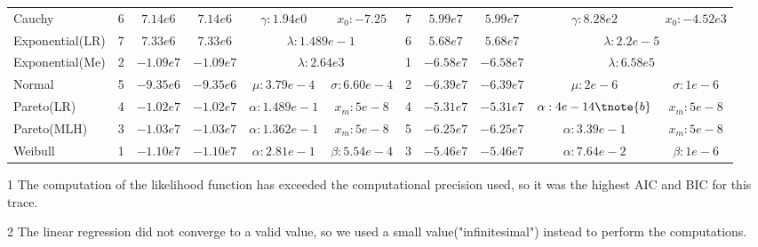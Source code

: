 \begin{table}
\begin{threeparttable}[t]
\begin{tabular}{lcccccccccc}
            Cauchy          &    6 & $7.14e6$    & $7.14e6$   & $\gamma:1.94e0$ &$x_0:-7.25$    
            &    7 & $5.99e7$    & $5.99e7$   & $ \gamma:8.28e2$ &$x_0:-4.52e3$    \\
            Exponential(LR) &    7 & $7.33e6$    & $7.33e6$   & \multicolumn{2}{c}{$\lambda:1.489e-1$}   
            &    6 & $5.68e7$    & $ 5.68e7$  & \multicolumn{2}{c}{$\lambda:2.2e-5$}   \\
            Exponential(Me) &    2 & $-1.09e7$   & $-1.09e7$  & \multicolumn{2}{c}{$\lambda:2.64e3$}   
            &    1 & $-6.58e7$   & $-6.58e7$  & \multicolumn{2}{c}{$\lambda:6.58e5$} \\
            Normal          &    5 & $-9.35e6$   & $-9.35e6$  & $\mu:3.79e-4$   &$\sigma:6.60e-4$ 
            &    2 & $-6.39e7$   & $-6.39e7$  & $\mu:2e-6$     & $\sigma:1e-6$ \\
            Pareto(LR)      &    4 & $-1.02e7$   & $-1.02e7$  & $\alpha:1.489e-1 $ & $x_m:5e-8 $    
            &    4 & $-5.31e7$   & $-5.31e7$  & $\alpha:4e-14\tnote{b}$ & $x_m:5e-8 $    \\
            Pareto(MLH)     &    3 & $-1.03e7$   & $-1.03e7$  & $\alpha:1.362e-1$ & $x_m:5e-8 $    
            &    5 & $-6.25e7$   & $-6.25e7$  & $\alpha:3.39e-1$ & $x_m:5e-8 $    \\
            Weibull         &    1 & $-1.10e7$   & $-1.10e7$  & $\alpha:2.81e-1$ & $\beta:5.54e-4$  
            &    3 & $-5.46e7$   & $-5.46e7$  & $\alpha:7.64e-2$ & $\beta:1e-6$  \\ \hline
        \end{tabular}
            \begin{tablenotes}
            \item[1] The computation of the likelihood function has exceeded the computational precision used, so it was the highest AIC and BIC  for this trace.
            \item[2] The linear regression did not converge to a valid value, so we used a small value("infinitesimal") instead to perform the computations.
            \end{tablenotes}
        \end{threeparttable}
    \label{tab:prototype-results}
\end{table}

